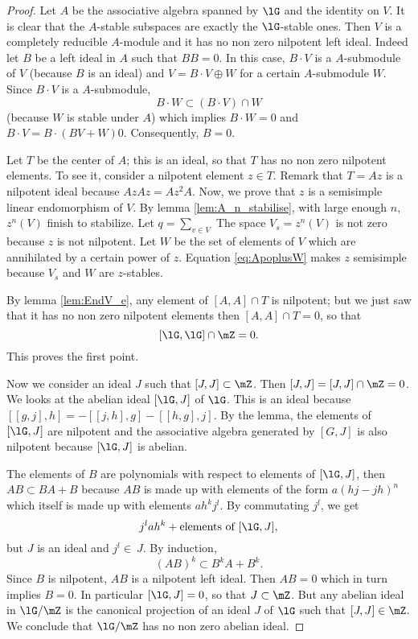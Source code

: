 \begin{proof}
Let $A$ be the associative algebra spanned by $\lG$ and the identity on $V$. It is clear that the $A$-stable subspaces are exactly the $\lG$-stable ones. Then $V$ is a completely reducible $A$-module and it has no non zero nilpotent left ideal. Indeed let $B$ be a left ideal in $A$ such that $BB=0$. In this case, $B\cdot V$ is a $A$-submodule of $V$ (because $B$ is an ideal) and $V=B\cdot V\oplus W$ for a certain $A$-submodule $W$. Since $B\cdot V$ is a $A$-submodule, 
\[
B\cdot W\subset(B\cdot V)\cap W
\]
(because $W$ is stable under $A$) which implies $B\cdot W=0$ and $B\cdot V=B\cdot(BV+W) 0$. Consequently, $B=0$.

Let $T$ be the center of $A$; this is an ideal, so that $T$ has no non zero nilpotent elements. To see it, consider a nilpotent element $z\in T$. Remark that $T=Az$  is a nilpotent ideal because $AzAz=Az^2A$. Now, we prove that $z$ is a semisimple linear endomorphism of $V$. By lemma \ref{lem:A_n_stabilise}, with large enough $n$, $z^n(V)$ finish to stabilize. Let $q=\sum_{v\in V}$  The space $V_s=z^n(V)$ is not zero because $z$ is not nilpotent. Let $W$ be the set of elements of $V$ which are annihilated by a certain power of $z$. Equation \eqref{eq:ApoplusW} makes $z$ semisimple because $V_s$ and $W$ are $z$-stables.

By lemma \ref{lem:EndV_e}, any element of $[A,A]\cap T$ is nilpotent; but we just saw that it has no non zero nilpotent elements then $[A,A]\cap T=0$, so that 
\[
[\lG,\lG]\cap\mZ=0.
\]
This proves the first point. 

Now we consider  an ideal $J$ such that $[J,J]\subset\mZ$. Then $[J,J]=[J,J]\cap \mZ=0$. We looks at the abelian ideal $[\lG,J]$ of $\lG$. This is an ideal because $[[g,j],h]=-[[j,h],g]-[[h,g],j]$. By the lemma, the elements of $[\lG,J]$ are nilpotent and the associative algebra generated by $[G,J]$ is also nilpotent because $[\lG,J]$ is abelian.

The elements of $B$ are polynomials with respect to elements of $[\lG,J]$, then $AB\subset BA+B$ because $AB$ is made up with elements of the form $a(hj-jh)^n$ which itself is made up with elements $ah^kj^l$. By commutating $j^l$, we get 
\[
j^lah^k+\text{elements of } [\lG,J],
\]
but $J$ is an ideal and $j^l\in\ J$. By induction,
\begin{equation}
(AB)^k\subset B^kA+B^k.
\end{equation}
Since $B$ is nilpotent, $AB$ is a nilpotent left ideal. Then $AB=0$ which in turn implies $B=0$. In particular $[\lG,J]=0$, so that $J\subset\mZ$. But any abelian ideal in $\lG/\mZ$ is the canonical projection of an ideal $J$ of $\lG$ such that $[J,J]\in\mZ$. We conclude that $\lG/\mZ$ has no non zero abelian ideal.

\end{proof}

